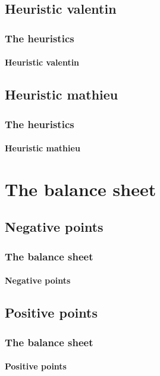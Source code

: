\documentclass[a4paper, 11pt]{beamer}
\begin{document}
\subsection{Heuristic valentin}
\begin{frame}
\frametitle{The heuristics}
\framesubtitle{Heuristic valentin}

\end{frame}

\subsection{Heuristic mathieu}
\begin{frame}
\frametitle{The heuristics}
\framesubtitle{Heuristic mathieu}

\end{frame}

\section{The balance sheet}
\subsection{Negative points}
\begin{frame}
\frametitle{The balance sheet}
\framesubtitle{Negative points}

\end{frame}

\subsection{Positive points}
\begin{frame}
\frametitle{The balance sheet}
\framesubtitle{Positive points}

\end{frame}
\end{document}
